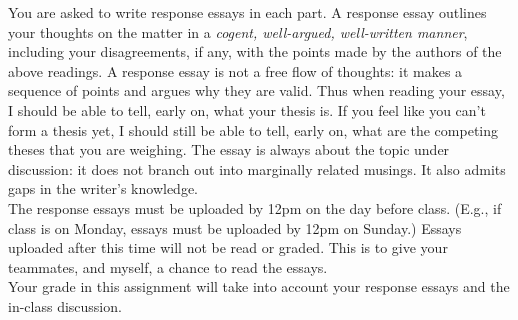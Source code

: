 \documentclass[letta4 paper]{article}
\numberwithin{equation}{section}
\newcommand{\0}{\mathbf{0}}
\begin{document}
	You are asked to write response essays in each part.
	A response essay outlines your thoughts on the matter in a \textit{cogent, well-argued, well-written manner}, including your disagreements, if any, with the points made by the authors of the above readings. 
	A response essay is not a free flow of thoughts: it makes a sequence of points and argues why they are valid. 
	Thus when reading your essay, I should be able to tell, early on, what your thesis is. 
	If you feel like you can't form a thesis yet, I should still be able to tell, early on, what are the competing theses that you are weighing.
	The essay is always about the topic under discussion: it does not branch out into marginally related musings.
	It also admits gaps in the writer's knowledge.
	\\
	
	The response essays must be uploaded by 12pm on the day before class. (E.g., if class is on Monday, essays must be uploaded by 12pm on Sunday.)
	Essays uploaded after this time will not be read or graded.
	This is to give your teammates, and myself, a chance to read the essays.
	\\
	
	Your grade in this assignment will take into account your response essays and the in-class discussion.
	
\end{document}
